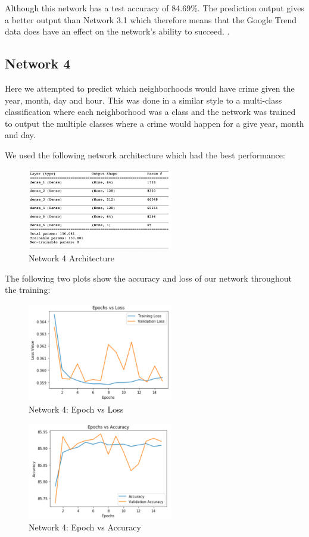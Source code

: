 \documentclass[conference]{IEEEtran}
\begin{document}
Although this network has a test accuracy of 84.69\%. The prediction output gives a better output than Network 3.1 which therefore
means that the Google Trend data does have an effect on the network's ability to succeed. \cite{Network_3.2}.

\subsection{Network 4 \cite{Network_4}}

Here we attempted to predict which neighborhoods would have crime given the year, month, day and hour. This was done in a similar
style to a multi-class classification where each neighborhood was a class and the network was trained to output the multiple
classes where a crime would happen for a give year, month and day.

We used the following network architecture which had the best performance:

\begin{figure}[H]
  \centering
  \captionsetup{justification=centering}
  \centering
  \includegraphics[width=2.5in]{15.png}
  \caption{Network 4 Architecture}  
  \label{1}
\end{figure}

The following two plots show the accuracy and loss of our network throughout the training:

\begin{figure}[H]
  \centering
  \captionsetup{justification=centering}
  \centering
  \includegraphics[width=2.5in]{16.png}
  \caption{Network 4: Epoch vs Loss}  
  \label{1}
\end{figure}

\begin{figure}[H]
  \centering
  \captionsetup{justification=centering}
  \centering
  \includegraphics[width=2.5in]{17.png}
  \caption{Network 4: Epoch vs Accuracy}  
  \label{1}
\end{figure}
\end{document}
